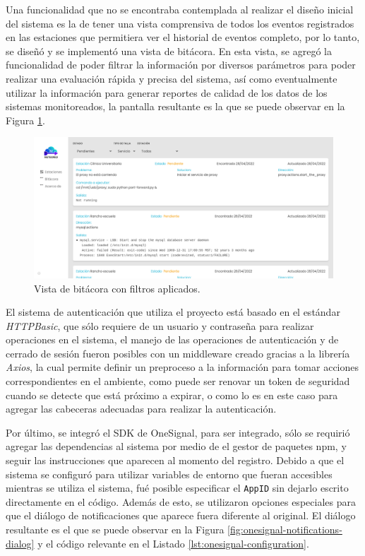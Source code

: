 Una funcionalidad que no se encontraba contemplada al realizar el diseño inicial del sistema es la de tener una vista comprensiva de todos los eventos registrados en las estaciones que permitiera ver el historial de eventos completo, por lo tanto, se diseñó y se implementó una vista de bitácora. En esta vista, se agregó la funcionalidad de poder filtrar la información por diversos parámetros para poder realizar una evaluación rápida y precisa del sistema, así como eventualmente utilizar la información para generar reportes de calidad de los datos de los sistemas monitoreados, la pantalla resultante es la que se puede observar en la Figura \ref{fig:bitacora-filters}.

\begin{figure}[!ht]
   \centering
   \includegraphics[width=1\linewidth]{images/screenshots/2.0.0-bitacora-filters.png}
   \caption{Vista de bitácora con filtros aplicados.}
   \label{fig:bitacora-filters}
\end{figure}

El sistema de autenticación que utiliza el proyecto está basado en el estándar \textit{HTTPBasic}, que sólo requiere de un usuario y contraseña para realizar operaciones en el sistema, el manejo de las operaciones de autenticación y de cerrado de sesión fueron posibles con un middleware creado gracias a la librería \textit{Axios}, la cual permite definir un preproceso a la información para tomar acciones correspondientes en el ambiente, como puede ser renovar un token de seguridad cuando se detecte que está próximo a expirar, o como lo es en este caso para agregar las cabeceras adecuadas para realizar la autenticación.

Por último, se integró el SDK de OneSignal, para ser integrado, sólo se requirió agregar las dependencias al sistema por medio de el gestor de paquetes npm, y seguir las instrucciones que aparecen al momento del registro. Debido a que el sistema se configuró para utilizar variables de entorno que fueran accesibles mientras se utiliza el sistema, fué posible especificar el \texttt{AppID} sin dejarlo escrito directamente en el código. Además de esto, se utilizaron opciones especiales para que el diálogo de notificaciones que aparece fuera diferente al original. El diálogo resultante es el que se puede observar en la Figura \ref{fig:onesignal-notifications-dialog} y el código relevante en el Listado \ref{lst:onesignal-configuration}.


